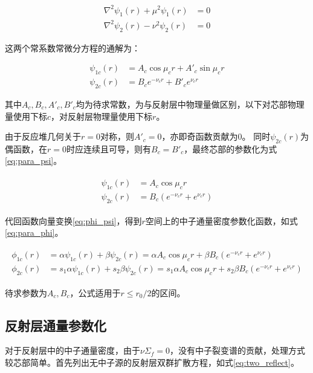 \begin{align}
    \nabla^2\psi_1(r) + \mu^2\psi_1(r) &= 0 \\
    \nabla^2\psi_2(r) - \nu^2\psi_2(r) &= 0
\end{align}

这两个常系数常微分方程的通解为：

\begin{align}
    \psi_{1c}(r) &= A_c\cos{\mu_c r} + A'_c\sin{\mu_c r} \\
    \psi_{2c}(r) &= B_c e^{-\nu_c r} + B'_c e^{\nu_c r}
\end{align}

其中$A_c,B_c,A'_c,B'_c$均为待求常数，为与反射层中物理量做区别，以下对芯部物理量使用下标$c$，对反射层物理量使用下标$r$。

由于反应堆几何关于$r=0$对称，则$A'_c=0$，亦即奇函数贡献为$0$。
同时$\psi_{2c}(r)$为偶函数，在$r=0$时应连续且可导，则有$B_c=B'_c$，最终芯部的参数化为式\ref{eq:para_psi}。

\begin{align}
    \label{eq:para_psi}
    \begin{split}
        \psi_{1c}(r) &= A_c\cos{\mu_c r} \\
        \psi_{2c}(r) &= B_c\left(e^{-\nu_c r} + e^{\nu_c r}\right)
    \end{split}
\end{align}

代回函数向量变换\ref{eq:phi_psi}，得到$r$空间上的中子通量密度参数化函数，如式\ref{eq:para_phi}。

\begin{align}
    \label{eq:para_phi}
    \begin{split}
        \phi_{1c}(r) &= \alpha\psi_{1c}(r) + \beta\psi_{2c}(r) = \alpha A_c\cos{\mu_c r} + \beta B_c\left(e^{-\nu_c r} + e^{\nu_c r}\right) \\
        \phi_{2c}(r) &= s_1\alpha\psi_{1c}(r) + s_2\beta\psi_{2c}(r) = s_1\alpha A_c\cos{\mu_c r} + s_2\beta B_c\left(e^{-\nu_c r} + e^{\nu_c r}\right)
    \end{split}
\end{align}

待求参数为$A_c,B_c$，公式适用于$r \leq r_0/2$的区间。

\subsection{反射层通量参数化}

对于反射层中的中子通量密度，由于$\nu\Sigma_f=0$，没有中子裂变谱的贡献，处理方式较芯部简单。首先列出无中子源的反射层双群扩散方程，如式\ref{eq:two_reflect}。

